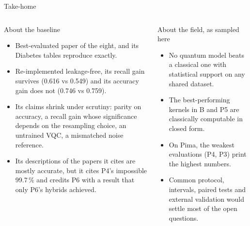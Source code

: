 \documentclass[aspectratio=169,10pt,t,xcolor={table}]{beamer}
\begin{document}
\begin{frame}{Take-home}
\begin{columns}[T]
\begin{block}{About the baseline}
\footnotesize
\begin{itemize}
  \item Best-evaluated paper of the eight, and its Diabetes tables reproduce exactly.
  \item Re-implemented leakage-free, its recall gain survives (0.616 vs 0.549) and its accuracy gain does not (0.746 vs 0.759).
  \item Its claims shrink under scrutiny: parity on accuracy, a recall gain whose significance depends on the resampling choice, an untrained VQC, a mismatched noise reference.
  \item Its descriptions of the papers it cites are mostly accurate, but it cites P4's impossible 99.7\,\% and credits P6 with a result that only P6's hybrids achieved.
\end{itemize}
\end{block}
\begin{block}{About the field, as sampled here}
\footnotesize
\begin{itemize}
  \item No quantum model beats a classical one with statistical support on any shared dataset.
  \item The best-performing kernels in B and P5 are classically computable in closed form.
  \item On Pima, the weakest evaluations (P4, P3) print the highest numbers.
  \item Common protocol, intervals, paired tests and external validation would settle most of the open questions.
\end{itemize}
\end{block}
\end{columns}
\end{frame}
\end{document}
